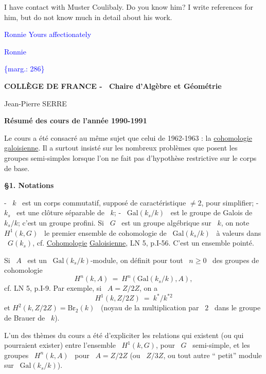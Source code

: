 \documentclass[11pt]{article}
\newcommand{\scanpage}[1]{\par\bigskip\noindent{\small\sffamily[scan #1]}\par}
\newcommand{\mspage}[1]{{\small\sffamily[p.\,#1]}}
\newcommand{\hand}[1]{\textcolor{blue}{#1}}
\newcommand{\margin}[1]{\textcolor{blue}{\{\textsf{marg.:} #1\}}}
\newcommand{\uline}[1]{\underline{#1}}
\begin{document}
I have contact with Muster Coulibaly. Do you know him? I write
references for him, but do not know much in detail about his work.

\hand{Ronnie} \hfill \hand{Yours affectionately}

\hfill \hand{Ronnie}

\mspage{5}

\margin{286}

\clearpage
\scanpage{119/288}
\textbf{COLLÈGE DE FRANCE - \ Chaire d'Algèbre et Géométrie}

Jean-Pierre SERRE

\textbf{Résumé des cours de l'année 1990-1991}

Le cours a été consacré au même sujet que celui de 1962-1963 : la \uline{cohomologie}
\uline{galoisienne}. Il a surtout insisté sur les nombreux problèmes que posent les
groupes semi-simples lorsque l'on ne fait pas d'hypothèse restrictive sur
le corps de base.

\textbf{§1. Notations}

- \ $k$ \ est un corps commutatif, supposé de caractéristique $\neq 2$, pour simplifier;
- $k_s$ \ est une clôture séparable de \ $k$;
- \ $\mathrm{Gal}(k_s/k)$ \ est le groupe de Galois de \ $k_s/k$; c'est un groupe profini.
Si \ $G$ \ est un groupe algébrique sur \ $k$, on note \ $H^1(k, G)$ \ le premier
ensemble de cohomologie de \ $\mathrm{Gal}(k_s/k)$ \ à valeurs dans \ $G(k_s)$, cf. \uline{Cohomologie}
\uline{Galoisienne}, LN 5, p.I-56. C'est un ensemble pointé.

Si \ $A$ \ est un \ $\mathrm{Gal}(k_s/k)$-module, on définit pour tout \ $n \geqslant 0$ \ des groupes de
cohomologie
\[ H^n(k, A) \ = \ H^n(\mathrm{Gal}(k_s/k), A), \]
cf. LN 5, p.I-9.
Par exemple, si \ $A = Z/2Z$, on a
\[ H^1(k, Z/2Z) \ = \ k^*/k^{*2} \]
et
\quad $H^2(k, Z/2Z) = \mathrm{Br}_2(k)$ \ (noyau de la multiplication par \ $2$ \ dans le groupe
de Brauer de \ $k$).

L'un des thèmes du cours a été d'expliciter les relations qui existent
(ou qui pourraient exister) entre l'ensemble \ $H^1(k, G)$, pour \ $G$ \ semi-simple,
et les groupes \ $H^n(k, A)$ \ pour \ $A = Z/2Z$ (ou \ $Z/3Z$, ou tout autre `` petit''
module sur \ $\mathrm{Gal}(k_s/k)$).
\end{document}
